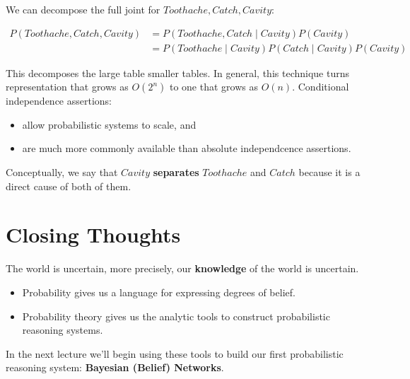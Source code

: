 \documentclass[11pt]{article}
\begin{document}
We can decompose the full joint for \(Toothache, Catch, Cavity\):

\begin{align*}
P(Toothache,Catch,Cavity) &= P(Toothache,Catch \mid Cavity) P(Cavity) \tag{product rule} \\
                           &= P(Toothache \mid Cavity) P(Catch \mid Cavity) P(Cavity) \tag{cond. ind. assertion above}
\end{align*}

This decomposes the large table smaller tables.  In general, this technique turns representation that grows as \(O(2^n)\) to one that grows as \(O(n)\).  Conditional independence assertions:

\begin{itemize}
\item allow probabilistic systems to scale, and
\item are much more commonly available than absolute independcence assertions.
\end{itemize}

Conceptually, we say that \(Cavity\) \textbf{separates} \(Toothache\) and \(Catch\) because it is a direct cause of both of them.
\section{Closing Thoughts}
\label{sec:orgc4f032f}

The world is uncertain, more precisely, our \textbf{knowledge} of the world is uncertain.

\begin{itemize}
\item Probability gives us a language for expressing degrees of belief.
\item Probability theory gives us the analytic tools to construct probabilistic reasoning systems.
\end{itemize}

In the next lecture we'll begin using these tools to build our first probabilistic reasoning system: \textbf{Bayesian (Belief) Networks}.
\end{document}
